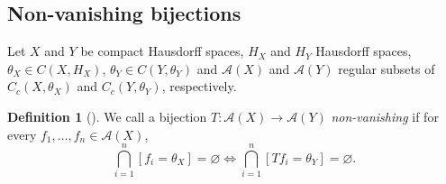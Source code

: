 \documentclass[letter,11pt]{amsart}
\theoremstyle{plain}		\newtheorem{theorem}[generalnumbering]{Theorem}
\theoremstyle{plain}		\newtheorem{corollary}[generalnumbering]{Corollary}
\theoremstyle{definition}		\newtheorem{definition}[generalnumbering]{Definition}
\theoremstyle{definition}		\newtheorem{example}[generalnumbering]{Example}
\theoremstyle{plain}		\newtheorem{proposition}[generalnumbering]{Proposition}
\theoremstyle{plain}		\newtheorem{lemma}[generalnumbering]{Lemma}
\theoremstyle{definition}
\begin{document}
\subsection{Non-vanishing bijections}

Let $X$ and $Y$ be compact Hausdorff spaces, $H_X$ and $H_Y$ Hausdorff spaces, $\theta_X\in C(X,H_X)$, $\theta_Y\in C(Y,\theta_Y)$ and $\mathcal{A}(X)$ and $\mathcal{A}(Y)$ regular subsets of $C_c(X,\theta_X)$ and $C_c(Y,\theta_Y)$, respectively.

\begin{definition}[\cite{MR2324919}]\label{definitionnonvanishingbijection}
	We call a bijection $T\colon\mathcal{A}(X)\to\mathcal{A}(Y)$ \emph{non-vanishing} if for every $f_1,\ldots,f_n\in\mathcal{A}(X)$,
	\[\bigcap_{i=1}^n[f_i=\theta_X]=\varnothing\iff\bigcap_{i=1}^n[Tf_i=\theta_Y]=\varnothing.\]
\end{definition}
\end{document}
